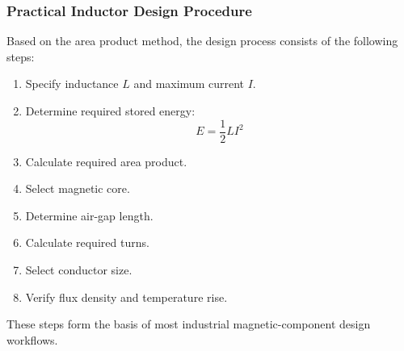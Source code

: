 \begin{frame} 
    \frametitle{Practical Inductor Design Procedure} 
    Based on the area product method, the design process consists of the following steps: 
    \vspace{0.2cm}
     \begin{enumerate} 
        \item Specify inductance $L$ and maximum current $I$. 
        \item Determine required stored energy: \[ E=\frac12LI^2 \] 
        \item Calculate required area product. 
        \item Select magnetic core. 
        \item Determine air-gap length. 
        \item Calculate required turns. 
        \item Select conductor size. 
        \item Verify flux density and temperature rise. 
    \end{enumerate} 
    \vspace{0.2cm} 
    These steps form the basis of most industrial magnetic-component design workflows. 
\end{frame} 

